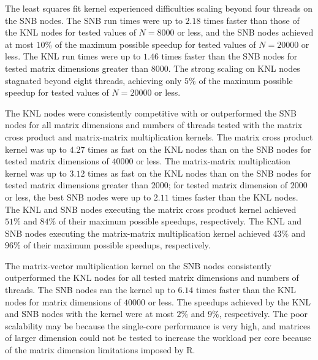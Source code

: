 The least squares fit kernel experienced difficulties scaling beyond
  four threads on the SNB nodes.
The SNB run times were up to $2.18$ times faster than those of the
  KNL nodes for tested values of $N=8000$ or less, and the SNB nodes achieved at
  most $10\%$ of the maximum possible speedup for tested values of $N=20000$ or
  less.
The KNL run times were up to $1.46$ times faster than the SNB nodes for tested
  matrix dimensions greater than $8000$.
The strong scaling on KNL nodes stagnated beyond eight threads, achieving
  only $5\%$ of the maximum possible speedup for tested values of $N=20000$ or
  less.

The KNL nodes were consistently competitive with or outperformed the
  SNB nodes for all matrix dimensions and numbers of threads tested
  with the matrix cross product and matrix-matrix multiplication
  kernels.
The matrix cross product kernel was up to $4.27$ times as fast on the KNL
  nodes than on the SNB nodes for tested matrix dimensions of $40000$ or less.
The matrix-matrix multiplication kernel was up to $3.12$ times as fast on the
  KNL nodes than on the SNB nodes for tested matrix dimensions greater than
  $2000$; for tested matrix dimension of $2000$ or less, the best SNB nodes were
  up to $2.11$ times faster than the KNL nodes.
The KNL and SNB nodes executing the matrix cross product kernel achieved $51\%$
  and $84\%$ of their maximum possible speedups, respectively.
The KNL and SNB nodes executing the matrix-matrix multiplication kernel achieved
  $43\%$ and $96\%$ of their maximum possible speedups, respectively.

The matrix-vector multiplication kernel on the SNB nodes consistently
  outperformed the KNL nodes for all tested matrix dimensions and numbers of
  threads.
The SNB nodes ran the kernel up to $6.14$ times faster than the KNL nodes for
  matrix dimensions of $40000$ or less.
The speedups achieved by the KNL and SNB nodes with the kernel were at most
  $2\%$ and $9\%$, respectively.
The poor scalability may be because the single-core performance is very high,
  and matrices of larger dimension could not be tested to increase the workload
  per core because of the matrix dimension limitations imposed by R.

